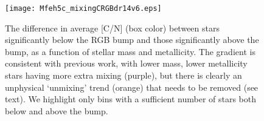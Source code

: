 \begin{figure}[!tb]
\begin{center}
\texttt{[image: Mfeh5c\_mixingCRGBdr14v6.eps]}%
\caption{The difference in average [C/N] (box color) between stars significantly below the RGB bump and those significantly above the bump, as a function of stellar mass and metallicity. The gradient is consistent with previous work, with lower mass, lower metallicity stars having more extra mixing (purple), but there is clearly an unphysical `unmixing' trend (orange) that needs to be removed (see text). We highlight only bins with a sufficient number of stars both below and above the bump.  }
\label{fig:obssquare}
\end{center}
\end{figure}


